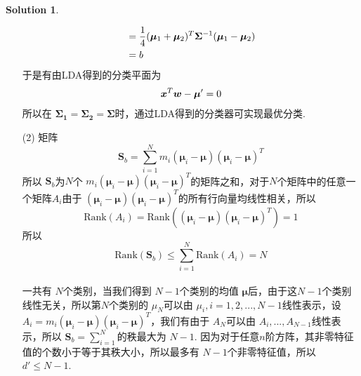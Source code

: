 \documentclass[a4paper,UTF8]{article}
\numberwithin{equation}{section}
\theoremstyle{definition}
\newtheorem*{solution}{Solution}
\newcommand{\bds}{\boldsymbol}
\begin{document}
\begin{solution}
\begin{itemize}
\begin{equation}
\begin{split}
				&= \frac{1}{4}(\bds{\mu}_1+\bds{\mu}_2)^T\bds{\Sigma}^{-1}(\bds{\mu}_1-\bds{\mu}_2)\\
				&= b
			\end{split}
			\notag
		\end{equation}
		于是有由LDA得到的分类平面为
		\begin{equation}
			\begin{split}
				\bds{x}^T\bds{w} - \bds{\mu}' &= 0 \\
			\end{split}
			\notag
		\end{equation}
		所以在 $\bds{\Sigma_1} = \bds{\Sigma_2} = \bds{\Sigma}$时，通过LDA得到的分类器可实现最优分类.
		\item[(2)]
		矩阵 $$\textbf{S}_b = \sum_{i=1}^{N}m_i(\bds{\mu}_i-\bds{\mu})(\bds{\mu}_i-\bds{\mu})^T$$所以 $\textbf{S}_b$为$N$个 $m_i(\bds{\mu}_i-\bds{\mu})(\bds{\mu}_i-\bds{\mu})^T$的矩阵之和，对于$N$个矩阵中的任意一个矩阵$A_i$由于 $(\bds{\mu}_i-\bds{\mu})(\bds{\mu}_i-\bds{\mu})^T$的所有行向量均线性相关，所以 $$\text{Rank}(A_i)=\text{Rank}((\bds{\mu}_i-\bds{\mu})(\bds{\mu}_i-\bds{\mu})^T) = 1$$ 所以 $$\text{Rank}(\textbf{S}_b) \leq \sum_{i=1}^{N} \text{Rank}(A_i) = N$$ \\
		一共有 $N$个类别，当我们得到 $N-1$个类别的均值 $\bds{\mu}$后，由于这$N-1$个类别线性无关，所以第$N$个类别的 $\mu_{N}$可以由 $\mu_i, i = 1,2, ..., N-1$线性表示，设 $A_i = m_i(\bds{\mu}_i-\bds{\mu})(\bds{\mu}_i-\bds{\mu})^T$，我们有由于 $A_N$可以由 $A_i,...,A_{N-1}$线性表示，所以 $\textbf{S}_b = \sum_{i=1}^{N}$的秩最大为 $N-1$.
		因为对于任意$n$阶方阵，其非零特征值的个数小于等于其秩大小，所以最多有 $N-1$个非零特征值，所以 $d'\leq N-1$.
	\end{itemize}
\end{solution}

\newpage
\end{document}
